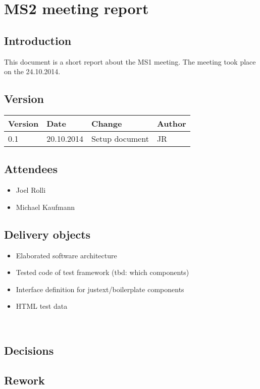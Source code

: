 
\chapter{MS2 meeting report} %

\label{ChapterX} %



\section{Introduction}

This document is a short report about the MS1 meeting. The meeting took place on the 24.10.2014.

\section{Version}


\begin{tabular}{| p{1.5cm} | p{2cm} | p{9cm} | p{1.5cm} |}
    \hline
    Version & Date      & Change & Author \\ \hline
    0.1    & 20.10.2014        & Setup document                                        & JR \\ \hline
\end{tabular}


\section{Attendees}
\begin{itemize}
\item Joel Rolli
\item Michael Kaufmann
\end{itemize}

\section{Delivery objects}

\begin{itemize}
\item Elaborated software architecture
\item Tested code of test framework (tbd: which components)
\item Interface definition for justext/boilerplate components
\item HTML test data
\end{itemize}\\

\section{Decisions}


\section{Rework}





